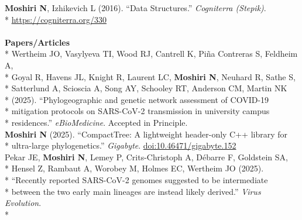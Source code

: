 \documentclass[margin,line]{res}
\begin{document}
\begin{resume}
\hspace*{4mm} \textbf{Moshiri N}, Izhikevich L (2016). ``Data Structures.'' \textit{Cogniterra (Stepik)}.\\*\vspace{2mm}
\hspace*{8mm} \href{https://cogniterra.org/330}{https://cogniterra.org/330}\\
~\\
\textbf{Papers/Articles}\vspace{2mm}\\*
\hspace*{4mm} Wertheim JO, Vasylyeva TI, Wood RJ, Cantrell K, Pi{\~n}a Contreras S, Feldheim A,\\*
\hspace*{9mm} Goyal R, Havens JL, Knight R, Laurent LC, \textbf{Moshiri N}, Neuhard R, Sathe S,\\*
\hspace*{9mm} Satterlund A, Scioscia A, Song AY, Schooley RT, Anderson CM, Martin NK\\*
\hspace*{9mm} (2025). ``Phylogeographic and genetic network assessment of COVID-19\\*
\hspace*{9mm} mitigation protocols on SARS-CoV-2 transmission in university campus\\*\vspace{2mm}
\hspace*{8mm} residences.'' \textit{eBioMedicine}. Accepted in Principle.\\
\hspace*{4mm} \textbf{Moshiri N} (2025). ``CompactTree: A lightweight header-only C++ library for\\*\vspace{2mm}
\hspace*{8mm} ultra-large phylogenetics.'' \textit{Gigabyte}. \href{https://doi.org/10.46471/gigabyte.152}{doi:10.46471/gigabyte.152}\\
\hspace*{4mm} Pekar JE, \textbf{Moshiri N}, Lemey P, Crits-Christoph A, D\'ebarre F, Goldstein SA,\\*
\hspace*{9mm} Hensel Z, Rambaut A, Worobey M, Holmes EC, Wertheim JO (2025).\\*
\hspace*{9mm} ``Recently reported SARS-CoV-2 genomes suggested to be intermediate\\*
\hspace*{9mm} between the two early main lineages are instead likely derived.'' \textit{Virus Evolution}.\\*\vspace{2mm}

\end{resume}
\end{document}
